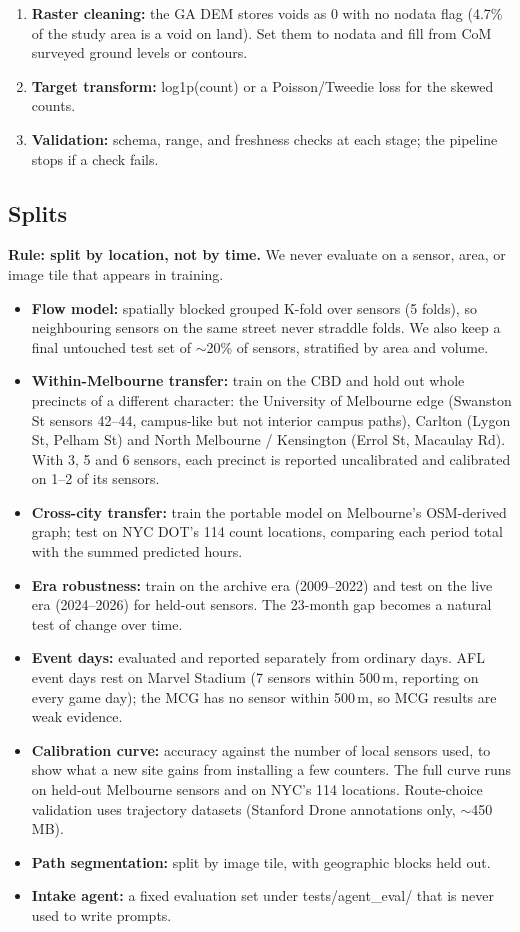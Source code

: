 \documentclass[11pt]{article}
\begin{document}
\begin{enumerate}
  \item \textbf{Raster cleaning:} the GA DEM stores voids as 0 with no nodata flag (4.7\% of the study area is a void on land). Set them to nodata and fill from CoM surveyed ground levels or contours.
  \item \textbf{Target transform:} log1p(count) or a Poisson/Tweedie loss for the skewed counts.
  \item \textbf{Validation:} schema, range, and freshness checks at each stage; the pipeline stops if a check fails.
\end{enumerate}

\subsection{Splits}

\textbf{Rule: split by location, not by time.} We never evaluate on a sensor, area, or image tile that appears in training.
\begin{itemize}
  \item \textbf{Flow model:} spatially blocked grouped K-fold over sensors (5 folds), so neighbouring sensors on the same street never straddle folds. We also keep a final untouched test set of $\sim$20\% of sensors, stratified by area and volume.
  \item \textbf{Within-Melbourne transfer:} train on the CBD and hold out whole precincts of a different character: the University of Melbourne edge (Swanston St sensors 42--44, campus-like but not interior campus paths), Carlton (Lygon St, Pelham St) and North Melbourne / Kensington (Errol St, Macaulay Rd). With 3, 5 and 6 sensors, each precinct is reported uncalibrated and calibrated on 1--2 of its sensors.
  \item \textbf{Cross-city transfer:} train the portable model on Melbourne's OSM-derived graph; test on NYC DOT's 114 count locations, comparing each period total with the summed predicted hours.
  \item \textbf{Era robustness:} train on the archive era (2009--2022) and test on the live era (2024--2026) for held-out sensors. The 23-month gap becomes a natural test of change over time.
  \item \textbf{Event days:} evaluated and reported separately from ordinary days. AFL event days rest on Marvel Stadium (7 sensors within 500\,m, reporting on every game day); the MCG has no sensor within 500\,m, so MCG results are weak evidence.
  \item \textbf{Calibration curve:} accuracy against the number of local sensors used, to show what a new site gains from installing a few counters. The full curve runs on held-out Melbourne sensors and on NYC's 114 locations. Route-choice validation uses trajectory datasets (Stanford Drone annotations only, $\sim$450\,MB).
  \item \textbf{Path segmentation:} split by image tile, with geographic blocks held out.
  \item \textbf{Intake agent:} a fixed evaluation set under tests/agent\_eval/ that is never used to write prompts.
\end{itemize}
\end{document}
